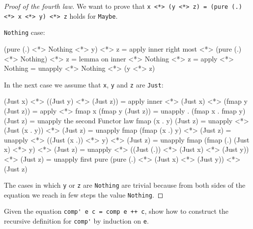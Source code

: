\documentclass[12pt]{article}
\newenvironment{code}{\endgraf\verbatim}{\endverbatim}
\newenvironment{problem}[2][Problem]{\begin{trivlist}
\item[\hskip \labelsep {\bfseries #1}\hskip \labelsep {\bfseries #2.}]}{\end{trivlist}}
\begin{document}
\begin{proof}[Proof of the fourth law]
We want to prove that \verb|x <*> (y <*> z) = (pure (.) <*> x <*> y) <*> z| holds for \verb|Maybe|.

\verb|Nothing| case:

\begin{code}
  (pure (.) <*> Nothing <*> y) <*> z
=   { apply inner right most <*> }
  (pure (.) <*> Nothing) <*> z
=   { lemma on inner <*> }
  Nothing <*> z
=   { apply <*> }
  Nothing
=   { unapply <*> }
  Nothing <*> (y <*> z)
\end{code}

In the next case we assume that \verb|x|, \verb|y| and \verb|z| are \verb|Just|:

\begin{code}
  (Just x) <*> ((Just y) <*> (Just z))
=   { apply inner <*> }
  (Just x) <*> (fmap y (Just z))
=   { apply <*> }
  fmap x (fmap y (Just z))
=   { unapply . }
  (fmap x . fmap y) (Just z)
=   { unapply the second Functor law }
  fmap (x . y) (Just z)
=   { unapply <*> }
  (Just (x . y)) <*> (Just z)
=   { unapply fmap }
  (fmap (x .) y) <*> (Just z)
=   { unapply <*> }
  ((Just (x .)) <*> y) <*> (Just z)
=   { unapply fmap }
  (fmap (.) (Just x) <*> y) <*> (Just z)
=   { unapply <*> }
  ((Just (.)) <*> (Just x) <*> (Just y)) <*> (Just z)
=   { unapply first pure }
  (pure (.) <*> (Just x) <*> (Just y)) <*> (Just z)
\end{code}

The cases in which \verb|y| or \verb|z| are \verb|Nothing| are trivial because from both sides of the equation we reach in few steps the value \verb|Nothing|.
\end{proof}


\begin{problem}{5}
Given the equation \verb|comp' e c = comp e ++ c|, show how to construct the recursive definition for \verb|comp'| by induction on \verb|e|.
\end{problem}
\end{document}
